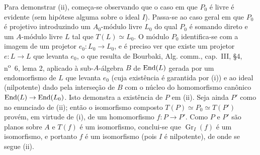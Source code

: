 Para demonstrar (ii), começa-se observando que o caso em que $P_0$ é livre é evidente (sem hipótese alguma sobre o ideal $I$). Passa-se ao caso geral em que $P_0$ é projetivo introduzindo um $A_0$-módulo livre $L_0$ do qual $P_0$ é somando direto e um $A$-módulo livre $L$ tal que $T(L)\simeq L_0$. O módulo $P_0$ identifica-se com a imagem de um projetor $e_0:L_0\to L_0$, e é preciso ver que existe um projetor $e:L\to L$ que levanta $e_0$, o que resulta de Bourbaki, Alg. comm., cap.~III, §4, n\textsuperscript{o}~6, lema 2, aplicado à sub-$A$-álgebra $B$ de $\operatorname{End}(L)$ gerada por um endomorfismo de $L$ que levanta $e_0$ (cuja existência é garantida por (i)) e ao ideal (nilpotente) dado pela interseção de $B$ com o núcleo do homomorfismo canônico $\operatorname{End}(L)\to\operatorname{End}(L_0)$. Isto demonstra a existência de $P$ em (ii). Seja ainda $P'$ como no enunciado de (ii); então o isomorfismo composto $T(P)\simeq P_0\simeq T(P')$ provém, em virtude de (i), de um homomorfismo $f:P\to P'$. Como $P$ e $P'$ são planos sobre $A$ e $T(f)$ é um isomorfismo, conclui-se que $\operatorname{Gr}_I(f)$ é um isomorfismo, e portanto $f$ é um isomorfismo (pois $I$ é nilpotente), de onde se segue (ii).
